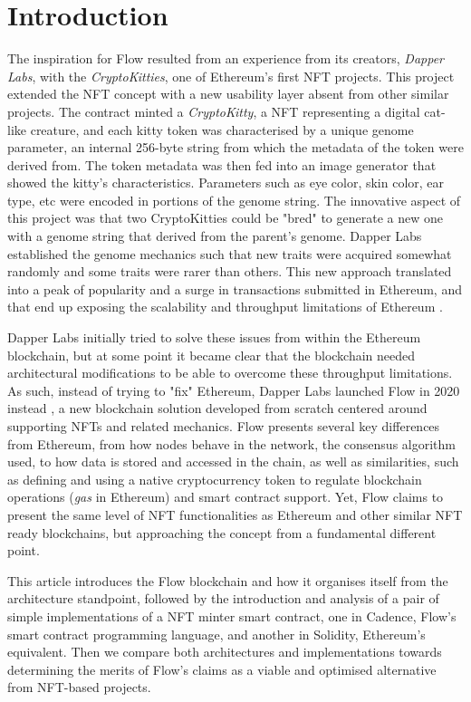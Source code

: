 \documentclass[../NFTComp_IEEE.tex]{subfiles}
\begin{document}
\section{Introduction}
\label{sec:introduction}
The inspiration for Flow resulted from an experience from its creators, \textit{Dapper Labs}, with the \textit{CryptoKitties}, one of Ethereum's first NFT projects. This project extended the NFT concept with a new usability layer absent from other similar projects. The contract minted a \textit{CryptoKitty}, a NFT representing a digital cat-like creature, and each kitty token was characterised by a unique genome parameter, an internal 256-byte string from which the metadata of the token were derived from. The token metadata was then fed into an image generator that showed the kitty's characteristics. Parameters such as eye color, skin color, ear type, etc were encoded in portions of the genome string. The innovative aspect of this project was that two CryptoKitties could be "bred" to generate a new one with a genome string that derived from the parent's genome. Dapper Labs established the genome mechanics such that new traits were acquired somewhat randomly and some traits were rarer than others. This new approach translated into a peak of popularity and a surge in transactions submitted in Ethereum, and that end up exposing the scalability and throughput limitations of Ethereum \cite{bbc2017}.
\par
Dapper Labs initially tried to solve these issues from within the Ethereum blockchain, but at some point it became clear that the blockchain needed architectural modifications to be able to overcome these throughput limitations. As such, instead of trying to "fix" Ethereum, Dapper Labs launched Flow in 2020 instead \cite{Gharegozlou2019}, a new blockchain solution developed from scratch centered around supporting NFTs and related mechanics. Flow presents several key differences from Ethereum, from how nodes behave in the network, the consensus algorithm used, to how data is stored and accessed in the chain, as well as similarities, such as defining and using a native cryptocurrency token to regulate blockchain operations (\textit{gas} in Ethereum) and smart contract support. Yet, Flow claims to present the same level of NFT functionalities as Ethereum and other similar NFT ready blockchains, but approaching the concept from a fundamental different point.
\par
This article introduces the Flow blockchain and how it organises itself from the architecture standpoint, followed by the introduction and analysis of a pair of simple implementations of a NFT minter smart contract, one in Cadence, Flow's smart contract programming language, and another in Solidity, Ethereum's equivalent. Then we compare both architectures and implementations towards determining the merits of Flow's claims as a viable and optimised alternative from NFT-based projects.
\end{document}
